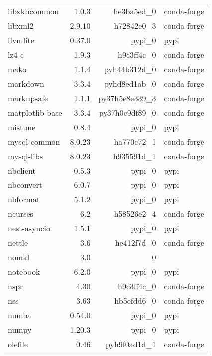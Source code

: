 \begin{table}
\begin{center}
\begin{tabular}{|l|r|r|l|}
			libxkbcommon &1.0.3 & he3ba5ed\_0 &conda-forge \\
			libxml2 &2.9.10 & h72842e0\_3 &conda-forge \\
			llvmlite &0.37.0 & pypi\_0 &pypi \\
			lz4-c &1.9.3 & h9c3ff4c\_0 &conda-forge \\
			mako &1.1.4 & pyh44b312d\_0 &conda-forge \\
			markdown &3.3.4 & pyhd8ed1ab\_0 &conda-forge \\
			markupsafe &1.1.1 & py37h5e8e339\_3 &conda-forge \\
			matplotlib-base &3.3.4 & py37h0c9df89\_0 &conda-forge \\
			mistune &0.8.4 & pypi\_0 &pypi \\
			mysql-common &8.0.23 & ha770c72\_1 &conda-forge \\
			mysql-libs &8.0.23 & h935591d\_1 &conda-forge \\
			nbclient &0.5.3 & pypi\_0 &pypi \\
			nbconvert &6.0.7 & pypi\_0 &pypi \\
			nbformat &5.1.2 & pypi\_0 &pypi \\
			ncurses &6.2 & h58526e2\_4 &conda-forge \\
			nest-asyncio &1.5.1 & pypi\_0 &pypi \\
			nettle &3.6 & he412f7d\_0 &conda-forge \\
			nomkl &3.0 & 0 & \\
			notebook &6.2.0 & pypi\_0 &pypi \\
			nspr &4.30 & h9c3ff4c\_0 &conda-forge \\
			nss &3.63 & hb5efdd6\_0 &conda-forge \\
			numba &0.54.0 & pypi\_0 &pypi \\
			numpy &1.20.3 & pypi\_0 &pypi \\
			olefile &0.46 & pyh9f0ad1d\_1 &conda-forge \\
			
		\end{tabular}
	\end{center}
\end{table}		


